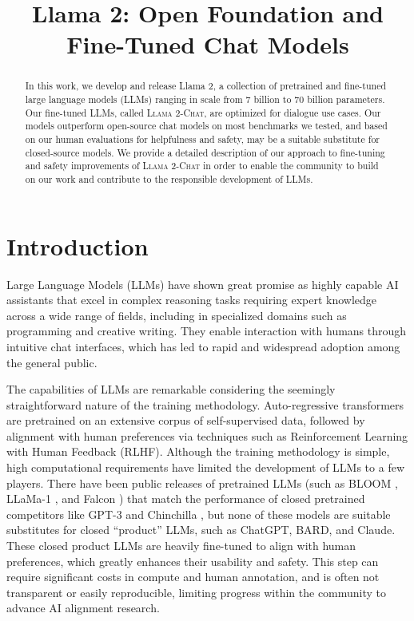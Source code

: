 \title{Llama 2: Open Foundation and Fine-Tuned Chat Models}

\begin{abstract}
In this work, we develop and release Llama 2, a collection of pretrained and fine-tuned large language models (LLMs) ranging in scale from 7 billion to 70 billion parameters. Our fine-tuned LLMs, called \textsc{Llama 2-Chat}, are optimized for dialogue use cases. Our models outperform open-source chat models on most benchmarks we tested, and based on our human evaluations for helpfulness and safety, may be a suitable substitute for closed-source models. We provide a detailed description of our approach to fine-tuning and safety improvements of \textsc{Llama 2-Chat} in order to enable the community to build on our work and contribute to the responsible development of LLMs.
\end{abstract}

\section{Introduction}

Large Language Models (LLMs) have shown great promise as highly capable AI assistants that excel in complex reasoning tasks requiring expert knowledge across a wide range of fields, including in specialized domains such as programming and creative writing. They enable interaction with humans through intuitive chat interfaces, which has led to rapid and widespread adoption among the general public.

The capabilities of LLMs are remarkable considering the seemingly straightforward nature of the training methodology.  Auto-regressive transformers are pretrained on an extensive corpus of self-supervised data, followed by alignment with human preferences via techniques such as Reinforcement Learning with Human Feedback (RLHF). Although the training methodology is simple, high computational requirements have limited the development of LLMs to a few players. There have been public releases of pretrained LLMs (such as BLOOM \citep{scao2022bloom}, LLaMa-1 \citep{Touvron2023LLaMAOA}, and Falcon \citep{penedo2023refinedweb}) that match the performance of closed pretrained competitors like GPT-3 \citep{gpt3} and Chinchilla \citep{hoffmann2022training}, but none of these models are suitable substitutes for closed ``product'' LLMs, such as ChatGPT, BARD, and Claude. These closed product LLMs are heavily fine-tuned to align with human preferences, which greatly enhances their usability and safety. This step can require significant costs in compute and human annotation, and is often not transparent or easily reproducible, limiting progress within the community to advance AI alignment research.

